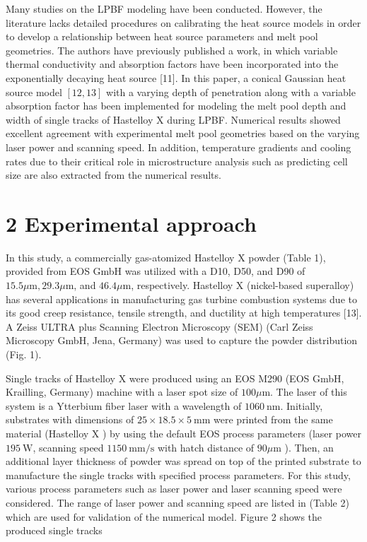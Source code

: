 \documentclass[10pt]{article}
\begin{document}
Many studies on the LPBF modeling have been conducted. However, the literature lacks detailed procedures on calibrating the heat source models in order to develop a relationship between heat source parameters and melt pool geometries. The authors have previously published a work, in which variable thermal conductivity and absorption factors have been incorporated into the exponentially decaying heat source [11]. In this paper, a conical Gaussian heat source model $[12,13]$ with a varying depth of penetration along with a variable absorption factor has been implemented for modeling the melt pool depth and width of single tracks of Hastelloy $\mathrm{X}$ during LPBF. Numerical results showed excellent agreement with experimental melt pool geometries based on the varying laser power and scanning speed. In addition, temperature gradients and cooling rates due to their critical role in microstructure analysis such as predicting cell size are also extracted from the numerical results.

\section*{2 Experimental approach}
In this study, a commercially gas-atomized Hastelloy $\mathrm{X}$ powder (Table 1), provided from EOS GmbH was utilized with a D10, D50, and D90 of $15.5 \mu \mathrm{m}, 29.3 \mu \mathrm{m}$, and $46.4 \mu \mathrm{m}$, respectively. Hastelloy X (nickel-based superalloy) has several applications in manufacturing gas turbine combustion systems due to its good creep resistance, tensile strength, and ductility at high temperatures [13]. A Zeiss ULTRA plus Scanning Electron Microscopy (SEM) (Carl Zeiss Microscopy GmbH, Jena, Germany) was used to capture the powder distribution (Fig. 1).

Single tracks of Hastelloy $\mathrm{X}$ were produced using an EOS M290 (EOS GmbH, Krailling, Germany) machine with a laser spot size of $100 \mu \mathrm{m}$. The laser of this system is a Ytterbium fiber laser with a wavelength of $1060 \mathrm{~nm}$. Initially, substrates with dimensions of $25 \times 18.5 \times 5 \mathrm{~mm}$ were printed from the same material (Hastelloy $\mathrm{X}$ ) by using the default EOS process parameters (laser power $195 \mathrm{~W}$, scanning speed $1150 \mathrm{~mm} / \mathrm{s}$ with hatch distance of $90 \mu \mathrm{m}$ ). Then, an additional layer thickness of powder was spread on top of the printed substrate to manufacture the single tracks with specified process parameters. For this study, various process parameters such as laser power and laser scanning speed were considered. The range of laser power and scanning speed are listed in (Table 2) which are used for validation of the numerical model. Figure 2 shows the produced single tracks
\end{document}
